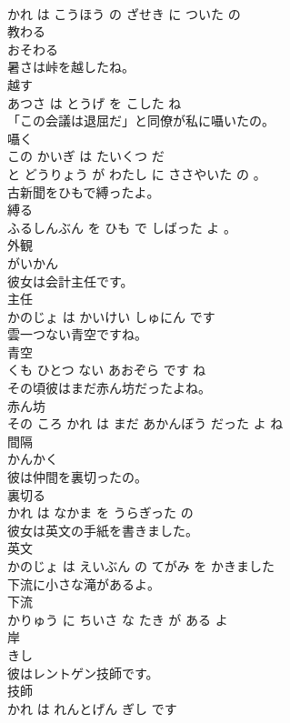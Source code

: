 \documentclass[8pt]{extreport}
\begin{document}
\begin{CJK}{UTF8}{min}
\\	かれ は こうほう の ざせき に ついた の			
\\	教わる	
\\	おそわる			
\\	暑さは峠を越したね。	
\\	越す 
\\	あつさ は とうげ を こした ね			
\\	「この会議は退屈だ」と同僚が私に囁いたの。	
\\	囁く 
\\	この かいぎ は たいくつ だ 
\\	と どうりょう が わたし に ささやいた の 。			
\\	古新聞をひもで縛ったよ。	
\\	縛る 
\\	ふるしんぶん を ひも で しばった よ 。			
\\	外観	
\\	がいかん			
\\	彼女は会計主任です。	
\\	主任 
\\	かのじょ は かいけい しゅにん です			
\\	雲一つない青空ですね。	
\\	青空 
\\	くも ひとつ ない あおぞら です ね			
\\	その頃彼はまだ赤ん坊だったよね。	
\\	赤ん坊 
\\	その ころ かれ は まだ あかんぼう だった よ ね			
\\	間隔	
\\	かんかく			
\\	彼は仲間を裏切ったの。	
\\	裏切る 
\\	かれ は なかま を うらぎった の			
\\	彼女は英文の手紙を書きました。	
\\	英文 
\\	かのじょ は えいぶん の てがみ を かきました			
\\	下流に小さな滝があるよ。	
\\	下流 
\\	かりゅう に ちいさ な たき が ある よ			
\\	岸	
\\	きし			
\\	彼はレントゲン技師です。	
\\	技師 
\\	かれ は れんとげん ぎし です			

\end{CJK}
\end{document}
